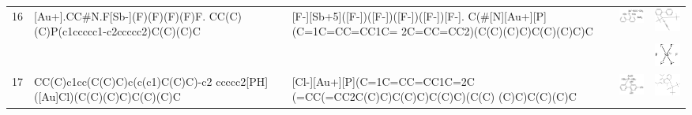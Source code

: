 \begin{landscape}
\begin{longtable}{m{0.3cm}m{6.7cm}m{7.7cm}m{2.3cm}m{2.3cm}}
 16 &
 [Au+].CC\#N.F[Sb-](F)(F)(F)(F)F. CC(C)(C)P(c1ccccc1-c2ccccc2)C(C)(C)C & 
 [F-][Sb+5]([F-])([F-])([F-])([F-])[F-]. C(\#[N][Au+][P](C=1C=CC=CC1C= 2C=CC=CC2)(C(C)(C)C)C(C)(C)C)C & 
 \includegraphics[width=2.2cm]{imagenes/sigmaAldrich/(Acetonitrile)[(2-biphenyl)di-tert-butylphosphine]gold(I) hexafluoroantimonate.jpeg} & 
 \includegraphics[width=2.2cm]{imagenes/sciFinder/pdf/(Acetonitrile)[(2-biphenyl)di-tert-butylphosphine]gold(I) hexafluoroantimonate [1compuesto].pdf} \\
  &  &  &  &
 \includegraphics[width=2.2cm]{imagenes/sciFinder/pdf/(Acetonitrile)[(2-biphenyl)di-tert-butylphosphine]gold(I) hexafluoroantimonate [2compuesto].pdf} \\
\hline



 17 &
 CC(C)c1cc(C(C)C)c(c(c1)C(C)C)-c2 ccccc2[PH]([Au]Cl)(C(C)(C)C)C(C)(C)C & 
 [Cl-][Au+][P](C=1C=CC=CC1C=2C (=CC(=CC2C(C)C)C(C)C)C(C)C)(C(C) (C)C)C(C)(C)C & 
 \includegraphics[width=2.2cm]{imagenes/sigmaAldrich/Chloro[2-di-tert-butyl(2,4,6-triisopropylbiphenyl)phosphine] gold(I).jpeg} & 
 \includegraphics[width=2.3cm]{imagenes/sciFinder/pdf/Chloro[2-di-tert-butyl(2,4,6-triisopropylbiphenyl)phosphine] gold(I).pdf} \\
\hline




\end{longtable}
\end{landscape}
